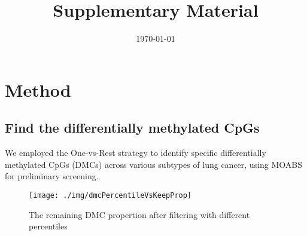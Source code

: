 \documentclass[11pt]{article}
\title{Supplementary Material}
\date{\today}
\begin{document}
    \maketitle


    \section{Method}\label{sec:method}

    \subsection{Find the differentially methylated CpGs}\label{subsec:find-the-differentially-methylated-cpgs-(dmcs)}

    We employed the One-vs-Rest strategy to identify specific differentially methylated CpGs (DMCs) across various subtypes of lung cancer, using MOABS\cite{sun_moabs_2014} for preliminary screening.

    \begin{figure}[htbp]
        \centering
        \texttt{[image: ./img/dmcPercentileVsKeepProp]}
        \caption{The remaining DMC propertion after filtering with different percentiles}
        \label{fig:dmc}
    \end{figure}



\end{document}
